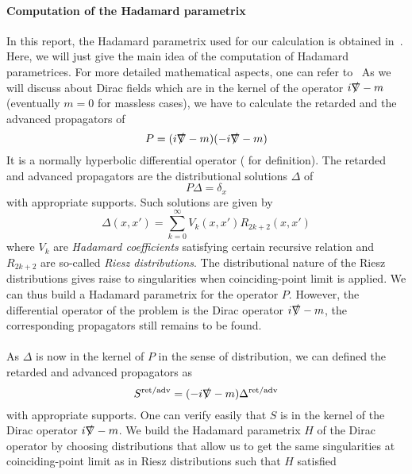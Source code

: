 \paragraph{Computation of the Hadamard parametrix}
In this report, the Hadamard parametrix used for our calculation is obtained in~\cite{Zahn2015}. 
Here, we will just give the main idea of the computation of Hadamard parametrices. 
For more detailed mathematical aspects, one can refer to~\cite{Bar2008}
As we will discuss about Dirac fields which are in the kernel of the operator $i\slashed{\nabla} - m$ (eventually $m=0$ for massless cases), 
we have to calculate the retarded and the advanced propagators of 
\begin{equation*}
P = (i\slashed{\nabla} - m)(-i\slashed{\nabla} -m) 
\end{equation*}
It is a normally hyperbolic differential operator (\cite{Bar2008} for definition).
The retarded and advanced propagators are the distributional solutions $\Delta$ of
\begin{equation*} 
P\Delta = \delta_x
\end{equation*}
with appropriate supports.
Such solutions are given by 
\begin{equation*}
\Delta(x,x') = \sum_{k=0}^\infty V_k(x,x') R_{2k+2}(x,x')
\end{equation*} 
where $V_k$ are \textit{Hadamard coefficients} satisfying certain recursive relation and $R_{2k+2}$ are so-called \textit{Riesz distributions}.
The distributional nature of the Riesz distributions gives raise to singularities when coinciding-point limit is applied. 
We can thus build a Hadamard parametrix for the operator $P$.
However, the differential operator of the problem is the Dirac operator $i\slashed{\nabla} -m$,
the corresponding propagators still remains to be found. \\\\
%
As $\Delta$ is now in the kernel of $P$ in the sense of distribution, 
we can defined the retarded and advanced propagators as 
\begin{equation*}
S^{\textrm{ret/adv}} = (-i\slashed{\nabla} - m)\Delta^{\textrm{ret/adv}} 
\end{equation*}
with appropriate supports.
One can verify easily that $S$ is in the kernel of the Dirac operator $i\slashed{\nabla} - m$.
We build the Hadamard parametrix $H$ of the Dirac operator by choosing distributions that allow us to get the same singularities at coinciding-point limit as in Riesz distributions such that $H$ satisfied

